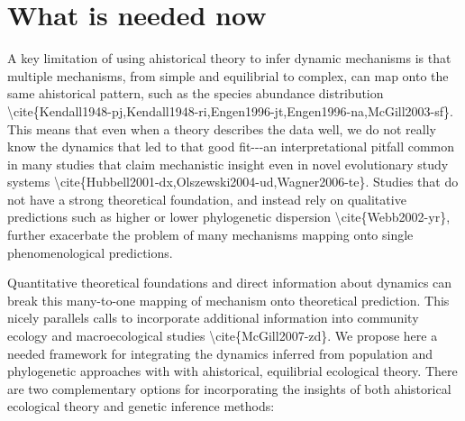 \documentclass[]{article}
\begin{document}
\section{What is needed now}\label{what-is-needed-now}

A key limitation of using ahistorical theory to infer dynamic mechanisms
is that multiple mechanisms, from simple and equilibrial to complex, can
map onto the same ahistorical pattern, such as the species abundance
distribution
\textbackslash{}cite\{Kendall1948-pj,Kendall1948-ri,Engen1996-jt,Engen1996-na,McGill2003-sf\}.
This means that even when a theory describes the data well, we do not
really know the dynamics that led to that good fit-\/-\/-an
interpretational pitfall common in many studies that claim mechanistic
insight even in novel evolutionary study systems
\textbackslash{}cite\{Hubbell2001-dx,Olszewski2004-ud,Wagner2006-te\}.
Studies that do not have a strong theoretical foundation, and instead
rely on qualitative predictions such as higher or lower phylogenetic
dispersion \textbackslash{}cite\{Webb2002-yr\}, further exacerbate the
problem of many mechanisms mapping onto single phenomenological
predictions.

Quantitative theoretical foundations and direct information about
dynamics can break this many-to-one mapping of mechanism onto
theoretical prediction. This nicely parallels calls to incorporate
additional information into community ecology and macroecological
studies \textbackslash{}cite\{McGill2007-zd\}. We propose here a needed
framework for integrating the dynamics inferred from population and
phylogenetic approaches with with ahistorical, equilibrial ecological
theory. There are two complementary options for incorporating the
insights of both ahistorical ecological theory and genetic inference
methods:
\end{document}
